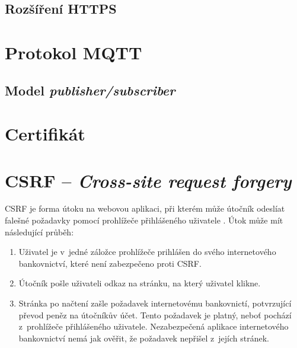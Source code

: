 \subsection{Rozšíření HTTPS}

\section{Protokol MQTT}

\subsection{Model \textit{publisher/subscriber}}




\section{Certifikát}

\cite{tcp_sec}


\section{CSRF -- \textit{Cross-site request forgery}}

CSRF je forma útoku na webovou aplikaci, při kterém může útočník odeslíat falešné požadavky pomocí prohlížeče přihlášeného uživatele \cite{csrf_owasp}. Útok může mít následující průběh:

\begin{enumerate}
    \item Uživatel je v~jedné záložce prohlížeče prihlášen do svého internetového bankovnictví, které není zabezpečeno proti CSRF.
    \item Útočník pošle uživateli odkaz na stránku, na který uživatel klikne.
    \item Stránka po načtení zašle požadavek internetovému bankovnictí, potvrzující převod peněz na útočníkův účet. Tento požadavek je platný, neboť pochází z~prohlížeče přihlášeného uživatele. Nezabezpečená aplikace internetového bankovnictví nemá jak ověřit, že požadavek nepřišel z~jejích stránek.
\end{enumerate}

